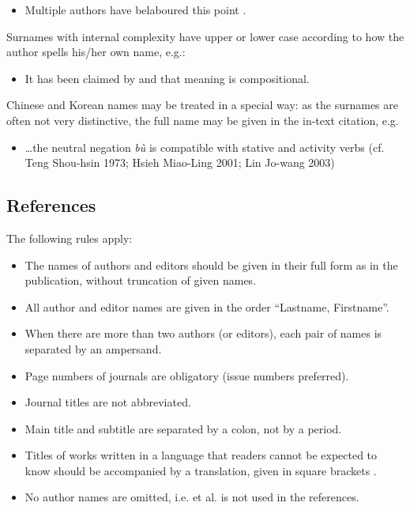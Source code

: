 \documentclass[charis,linguex,biblatex]{glossa}
\begin{document}
\begin{itemize}
\item Multiple authors have belaboured this point \citep{chomsky:1981,chomsky:1986a,chomsky:1986,iverson:1989,casali:1998a,blevins:2004,franks:2005}.
\end{itemize}
Surnames with internal complexity have upper or lower case according to how the author spells his/her own name, e.g.:

\begin{itemize}
\item It has been claimed by \citet{swart:1998} and \citet{belder:2011} that meaning is compositional. 
\end{itemize}
Chinese and Korean names may be treated in a special way: as the surnames are often not very distinctive, the full name may be given in the in-text citation, e.g.

\begin{itemize}
\item  \ldots the neutral negation \textit{bù} is compatible with stative and activity verbs (cf. Teng Shou-hsin 1973; Hsieh Miao-Ling 2001; Lin Jo-wang 2003) %
\end{itemize}

\subsection{References}\label{sec:refs}

The following rules apply:

\begin{itemize}
\item The names of authors and editors should be given in their full form as in the publication, without truncation of given names.
\item All author and editor names are given in the order ``Lastname, Firstname''.
\item When there are more than two authors (or editors), each pair of names is separated by an ampersand.
\item Page numbers of journals are obligatory (issue numbers preferred).
\item Journal titles are not abbreviated.
\item Main title and subtitle are separated by a colon, not by a period.
\item Titles of works written in a language that readers cannot be expected to know should be accompanied by a translation, given in square brackets \citep{Li1999}.
\item No author names are omitted, i.e. et al. is not used in the references.
\end{itemize}
\end{document}
